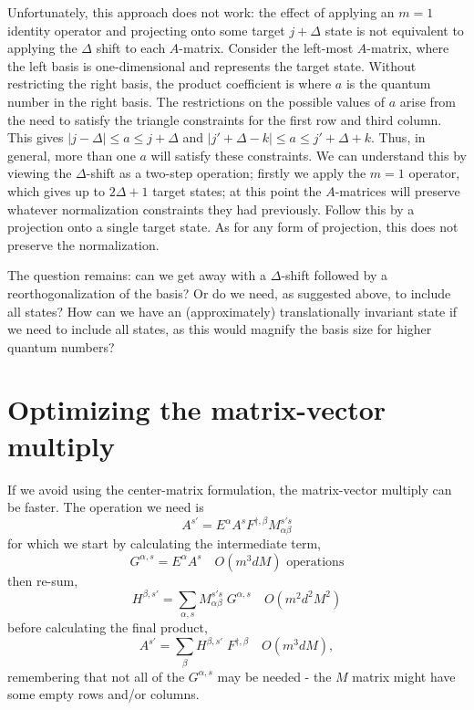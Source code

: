 \documentclass{article}[10pt]
\begin{document}
Unfortunately, this approach does not work: the effect of applying an $m=1$ identity operator
and projecting onto some target $j+\Delta$ state is not equivalent to applying the $\Delta$ shift
to each $A$-matrix. Consider the left-most $A$-matrix, where the left basis is one-dimensional
and represents the target state. Without restricting the right basis, the product coefficient is
\beq
{}
\eeq
where $a$ is the quantum number in the right basis. The restrictions on the possible values
of $a$ arise from the need to satisfy the triangle constraints for the first row and third column.
This gives $|j-\Delta| \leq a \leq j+\Delta$ and $|j'+\Delta-k| \leq a \leq j'+\Delta+k$.
Thus, in general, more than one $a$ will satisfy these constraints. We can understand this by
viewing the $\Delta$-shift as a two-step operation; firstly we apply the $m=1$ operator, which gives
up to $2\Delta+1$ target states; at this point the $A$-matrices will preserve whatever normalization
constraints they had previously. Follow this by a projection onto a single target state. As for any
form of projection, this does not preserve the normalization.

The question remains: can we get away with a $\Delta$-shift followed by a reorthogonalization of
the basis? Or do we need, as suggested above, to include all states? How can we have an (approximately)
translationally invariant state if we need to include all states, as this would magnify the basis
size for higher quantum numbers?

\section{Optimizing the matrix-vector multiply}

If we avoid using the center-matrix formulation, the matrix-vector multiply can be faster. The operation
we need is
\begin{equation}
A^{s'} = E^\alpha A^s F^{\dagger,\beta} M^{s's}_{\alpha \beta}
\end{equation}
for which we start by calculating the intermediate term,
\begin{equation}
G^{\alpha,s} = E^\alpha A^s \quad \mbox{$O(m^3 d M)$ operations}
\end{equation}
then re-sum,
\begin{equation}
H^{\beta,s'} = \sum_{\alpha,s} M^{s's}_{\alpha\beta} \; G^{\alpha,s} \quad \mbox{$O(m^2 d^2 M^2)$}
\end{equation}
before calculating the final product,
\begin{equation}
A^{s'} = \sum_{\beta} H^{\beta,s'} \; F^{\dagger,\beta} \quad \mbox{$O(m^3 d M)$},
\end{equation}
remembering that not all of the $G^{\alpha,s}$ may be needed - the $M$ matrix might
have some empty rows and/or columns.
\end{document}
